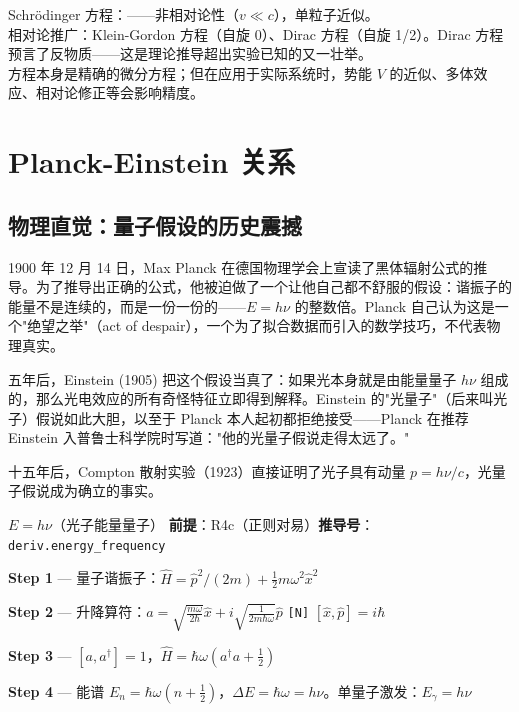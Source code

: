 \precisionbox[精度等级]
  Schr\"{o}dinger 方程：\preceffective——非相对论性（$v \ll c$），单粒子近似。\\
  相对论推广：Klein-Gordon 方程（自旋 0）、Dirac 方程（自旋 1/2）。Dirac 方程预言了反物质——这是理论推导超出实验已知的又一壮举。\\
  方程本身是精确的微分方程；但在应用于实际系统时，势能 $V$ 的近似、多体效应、相对论修正等会影响精度。
\endprecisionbox

\section{Planck-Einstein 关系}

\subsection{物理直觉：量子假设的历史震撼}

1900 年 12 月 14 日，Max Planck 在德国物理学会上宣读了黑体辐射公式的推导。为了推导出正确的公式，他被迫做了一个让他自己都不舒服的假设：谐振子的能量不是连续的，而是一份一份的——$E = h\nu$ 的整数倍。Planck 自己认为这是一个"绝望之举"（act of despair），一个为了拟合数据而引入的数学技巧，不代表物理真实。

五年后，Einstein (1905) 把这个假设当真了：如果光本身就是由能量量子 $h\nu$ 组成的，那么光电效应的所有奇怪特征立即得到解释。Einstein 的"光量子"（后来叫光子）假说如此大胆，以至于 Planck 本人起初都拒绝接受——Planck 在推荐 Einstein 入普鲁士科学院时写道："他的光量子假说走得太远了。"

十五年后，Compton 散射实验（1923）直接证明了光子具有动量 $p = h\nu/c$，光量子假说成为确立的事实。


\begin{lawbox}
  $E = h\nu$（光子能量量子）
  \quad\textbf{前提}：R4c（正则对易）\quad\textbf{推导号}：\texttt{deriv.energy\_frequency}
\end{lawbox}

\begin{derivationbox}
  \textbf{Step 1} — 量子谐振子：$\hat{H} = \hat{p}^2/(2m) + \frac{1}{2}m\omega^2\hat{x}^2$

  \textbf{Step 2} — 升降算符：$a = \sqrt{\frac{m\omega}{2\hbar}}\hat{x} + i\sqrt{\frac{1}{2m\hbar\omega}}\hat{p}$
  \hfill\texttt{[N]} $[\hat{x},\hat{p}] = i\hbar$

  \textbf{Step 3} — $[a, a^\dagger] = 1$，$\hat{H} = \hbar\omega(a^\dagger a + \frac{1}{2})$

  \textbf{Step 4} — 能谱 $E_n = \hbar\omega(n + \frac{1}{2})$，$\Delta E = \hbar\omega = h\nu$。单量子激发：$E_\gamma = h\nu$
\end{derivationbox}

